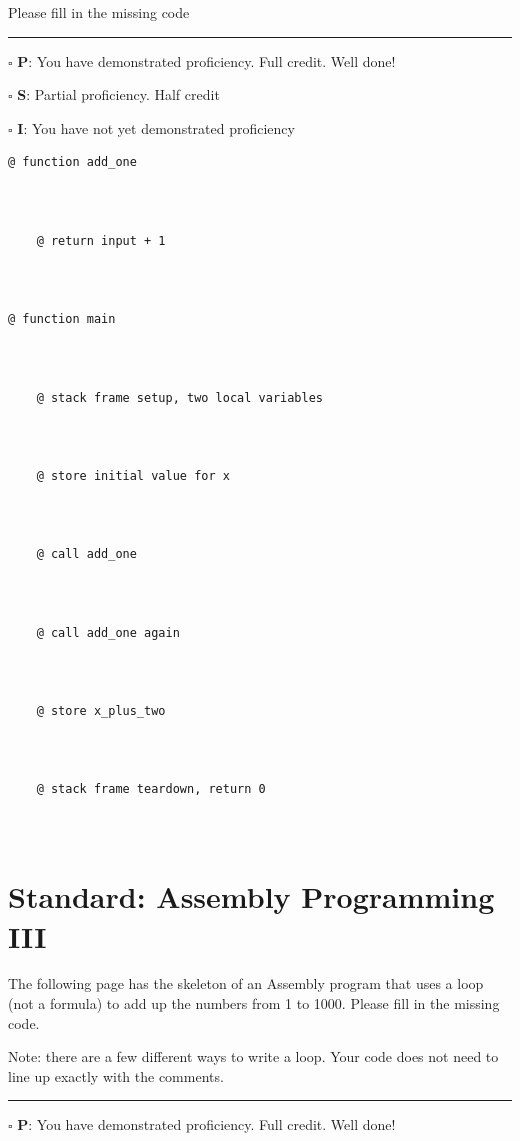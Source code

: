 \documentclass[12pt]{article}
\begin{document}
Please fill in the missing code

\vfill

\rule[1ex]{\textwidth}{.1pt}

$\square$ \textbf{P}: You have demonstrated proficiency. Full credit. Well done!

$\square$ \textbf{S}: Partial proficiency. Half credit

$\square$ \textbf{I}: You have not yet demonstrated proficiency

\newpage

\begin{verbatim}
@ function add_one



    @ return input + 1



@ function main


    
    @ stack frame setup, two local variables



    @ store initial value for x



    @ call add_one



    @ call add_one again



    @ store x_plus_two



    @ stack frame teardown, return 0



\end{verbatim}



\section*{Standard: Assembly Programming III}

The following page has the skeleton of an Assembly program that uses a loop (not a formula) to add up the numbers from 1 to 1000. Please fill in the missing code. 

Note: there are a few different ways to write a loop. Your code does not need to line up exactly with the comments.

\vfill

\rule[1ex]{\textwidth}{.1pt}

$\square$ \textbf{P}: You have demonstrated proficiency. Full credit. Well done!
\end{document}
